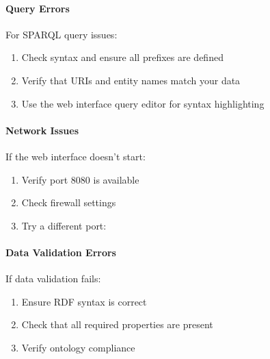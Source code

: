 \documentclass[letterpaper,10pt,english]{sphinxmanual}
\begin{document}
\paragraph{Query Errors}
\label{\detokenize{user-guide/first-steps:query-errors}}
\sphinxAtStartPar
For SPARQL query issues:
\begin{enumerate}
%
\item {} 
\sphinxAtStartPar
Check syntax and ensure all prefixes are defined

\item {} 
\sphinxAtStartPar
Verify that URIs and entity names match your data

\item {} 
\sphinxAtStartPar
Use the web interface query editor for syntax highlighting

\end{enumerate}


\paragraph{Network Issues}
\label{\detokenize{user-guide/first-steps:network-issues}}
\sphinxAtStartPar
If the web interface doesn’t start:
\begin{enumerate}
%
\item {} 
\sphinxAtStartPar
Verify port 8080 is available

\item {} 
\sphinxAtStartPar
Check firewall settings

\item {} 
\sphinxAtStartPar
Try a different port: 

\end{enumerate}


\paragraph{Data Validation Errors}
\label{\detokenize{user-guide/first-steps:data-validation-errors}}
\sphinxAtStartPar
If data validation fails:
\begin{enumerate}
%
\item {} 
\sphinxAtStartPar
Ensure RDF syntax is correct

\item {} 
\sphinxAtStartPar
Check that all required properties are present

\item {} 
\sphinxAtStartPar
Verify ontology compliance

\end{enumerate}
\end{document}
